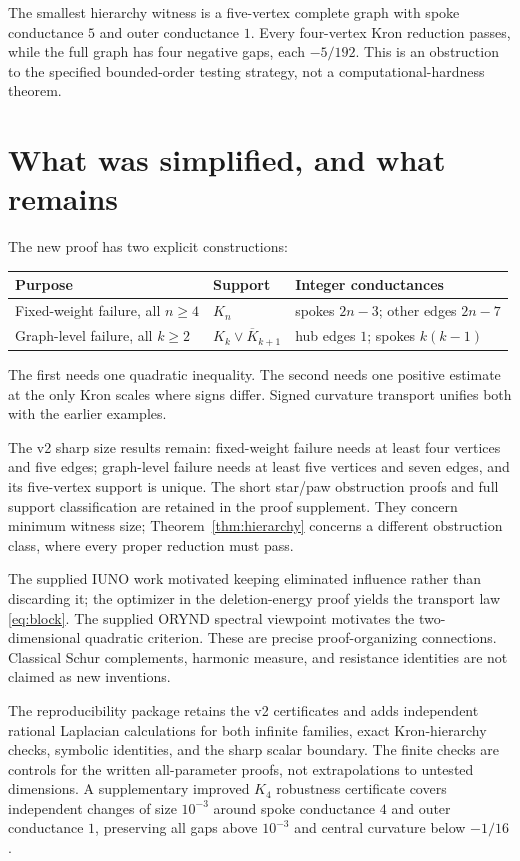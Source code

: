\documentclass[11pt,a4paper]{article}
\begin{document}
The smallest hierarchy witness is a five-vertex complete graph with spoke conductance $5$ and outer conductance $1$. Every four-vertex Kron reduction passes, while the full graph has four negative gaps, each $-5/192$. This is an obstruction to the specified bounded-order testing strategy, not a computational-hardness theorem.

\section{What was simplified, and what remains}
The new proof has two explicit constructions:
\begin{center}
\begin{tabular}{lll}
\toprule
Purpose&Support&Integer conductances\\\midrule
Fixed-weight failure, all $n\ge4$&
$K_n$&spokes $2n-3$; other edges $2n-7$\\
Graph-level failure, all $k\ge2$&
$K_k\vee\overline K_{k+1}$&hub edges $1$; spokes $k(k-1)$\\
\bottomrule
\end{tabular}
\end{center}
The first needs one quadratic inequality. The second needs one positive estimate at the only Kron scales where signs differ. Signed curvature transport unifies both with the earlier examples.

The v2 sharp size results remain: fixed-weight failure needs at least four vertices and five edges; graph-level failure needs at least five vertices and seven edges, and its five-vertex support is unique. The short star/paw obstruction proofs and full support classification are retained in the proof supplement. They concern minimum witness size; Theorem~\ref{thm:hierarchy} concerns a different obstruction class, where every proper reduction must pass.

The supplied IUNO work motivated keeping eliminated influence rather than discarding it; the optimizer in the deletion-energy proof yields the transport law \eqref{eq:block}. The supplied ORYND spectral viewpoint motivates the two-dimensional quadratic criterion. These are precise proof-organizing connections. Classical Schur complements, harmonic measure, and resistance identities are not claimed as new inventions.

The reproducibility package retains the v2 certificates and adds independent rational Laplacian calculations for both infinite families, exact Kron-hierarchy checks, symbolic identities, and the sharp scalar boundary. The finite checks are controls for the written all-parameter proofs, not extrapolations to untested dimensions. A supplementary improved $K_4$ robustness certificate covers independent changes of size $10^{-3}$ around spoke conductance $4$ and outer conductance $1$, preserving all gaps above $10^{-3}$ and central curvature below $-1/16$.
\end{document}
